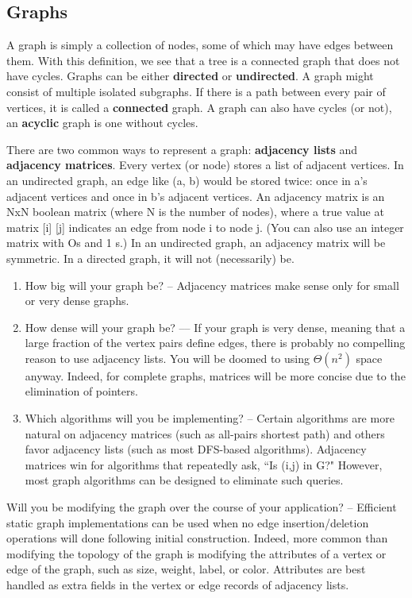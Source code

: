 \documentclass{article}
\begin{document}
    \subsection{Graphs}
    A graph is simply a collection of nodes, some of which may have edges between them. With this definition, we see that a tree is a connected graph that does not have cycles. Graphs can be either \textbf{directed} or \textbf{undirected}. A graph might consist of multiple isolated subgraphs. If there is a path between every pair of vertices, it is called a \textbf{connected} graph. A graph can also have cycles (or not), an \textbf{acyclic} graph is one without cycles. 
    
    There are two common ways to represent a graph: \textbf{adjacency lists} and \textbf{adjacency matrices}. Every vertex (or node) stores a list of adjacent vertices. In an undirected graph, an edge like (a, b) would be stored twice: once in a's adjacent vertices and once in b's adjacent vertices. An adjacency matrix is an NxN boolean matrix (where N is the number of nodes), where a true value at matrix [i] [j] indicates an edge from node i to node j. (You can also use an integer matrix with Os and 1 s.) In an undirected graph, an adjacency matrix will be symmetric. In a directed graph, it will not (necessarily) be. 
    
    \begin{enumerate}
        \item How big will your graph be? – Adjacency matrices make sense only for small or very dense graphs.
        \item How dense will your graph be? –– If your graph is very dense, meaning that a large fraction of the vertex pairs define edges, there is probably no compelling reason to use adjacency lists. You will be doomed to using $\Theta(n^2)$ space anyway. Indeed, for complete graphs, matrices will be more concise due to the elimination of pointers.
        \item Which algorithms will you be implementing? – Certain algorithms are more natural on adjacency matrices (such as all-pairs shortest path) and others favor adjacency lists (such as most DFS-based algorithms). Adjacency matrices win for algorithms that repeatedly ask, ``Is (i,j) in G?" However, most graph algorithms can be designed to eliminate such queries.
    \end{enumerate}
    
    Will you be modifying the graph over the course of your application? – Efficient static graph implementations can be used when no edge insertion/deletion operations will done following initial construction. Indeed, more common than modifying the topology of the graph is modifying the attributes of a vertex or edge of the graph, such as size, weight, label, or color. Attributes are best handled as extra fields in the vertex or edge records of adjacency lists.
    
\end{document}
